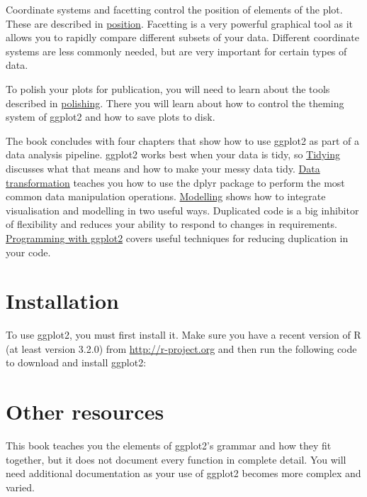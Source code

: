 Coordinate systems and facetting control the position of elements of the
plot. These are described in \hyperref[cha:position]{position}.
Facetting is a very powerful graphical tool as it allows you to rapidly
compare different subsets of your data. Different coordinate systems are
less commonly needed, but are very important for certain types of data.

To polish your plots for publication, you will need to learn about the
tools described in \hyperref[cha:polishing]{polishing}. There you will
learn about how to control the theming system of ggplot2 and how to save
plots to disk.

The book concludes with four chapters that show how to use ggplot2 as
part of a data analysis pipeline. ggplot2 works best when your data is
tidy, so \hyperref[cha:data]{Tidying} discusses what that means and how
to make your messy data tidy. \hyperref[cha:dplyr]{Data transformation}
teaches you how to use the dplyr package to perform the most common data
manipulation operations. \hyperref[cha:modelling]{Modelling} shows how
to integrate visualisation and modelling in two useful ways. Duplicated
code is a big inhibitor of flexibility and reduces your ability to
respond to changes in requirements.
\hyperref[cha:programming]{Programming with ggplot2} covers useful
techniques for reducing duplication in your code.

\section{Installation}\label{sec:installation}


To use ggplot2, you must first install it. Make sure you have a recent
version of R (at least version 3.2.0) from \url{http://r-project.org}
and then run the following code to download and install ggplot2:

\begin{Shaded}
\begin{Highlighting}[]
\NormalTok{(}\NormalTok{)}
\end{Highlighting}
\end{Shaded}

\section{Other resources}\label{sec:other-resources}

This book teaches you the elements of ggplot2's grammar and how they fit
together, but it does not document every function in complete detail.
You will need additional documentation as your use of ggplot2 becomes
more complex and varied.

